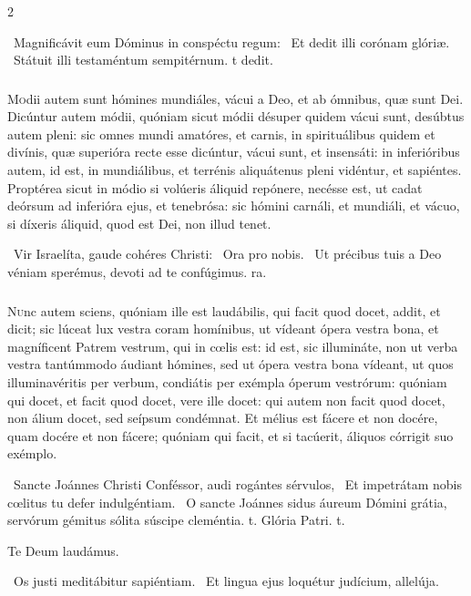 \documentclass[9pt,twoside]{extarticle}
\begin{document}
\begin{multicols}{2}
\begin{tightlist}{}
\item {}~Magnificávit eum Dóminus in conspéctu regum: \textred{*}~Et dedit illi corónam glóriæ. ~Státuit illi testaméntum sempitérnum. t dedit.
\end{tightlist}

\subsubsection*{\center{}}
\lettrine{M}odii autem sunt hómines mundiáles, vácui a Deo, et ab ómnibus, quæ sunt Dei. Dicúntur autem módii, quóniam sicut módii désuper quidem vácui sunt, desúbtus autem pleni: sic omnes mundi amatóres, et carnis, in spirituálibus quidem et divínis, quæ superióra recte esse dicúntur, vácui sunt, et insensáti: in inferióribus autem, id est, in mundiálibus, et terrénis aliquátenus pleni vidéntur, et sapiéntes. Proptérea sicut in módio si volúeris áliquid repónere, necésse est, ut cadat deórsum ad inferióra ejus, et tenebrósa: sic hómini carnáli, et mundiáli, et vácuo, si díxeris áliquid, quod est Dei, non illud tenet.

\begin{tightlist}{}
\item {}~Vir Israelíta, gaude cohéres Christi: \textred{*}~Ora pro nobis. ~Ut précibus tuis a Deo véniam sperémus, devoti ad te confúgimus. ra.
\end{tightlist}

\subsubsection*{\center{}}
\lettrine{N}unc autem sciens, quóniam ille est laudábilis, qui facit quod docet, addit, et dicit; sic lúceat lux vestra coram homínibus, ut vídeant ópera vestra bona, et magníficent Patrem vestrum, qui in cœlis est: id est, sic illumináte, non ut verba vestra tantúmmodo áudiant hómines, sed ut ópera vestra bona vídeant, ut quos illuminavéritis per verbum, condiátis per exémpla óperum vestrórum: quóniam qui docet, et facit quod docet, vere ille docet: qui autem non facit quod docet, non álium docet, sed seípsum condémnat. Et mélius est fácere et non docére, quam docére et non fácere; quóniam qui facit, et si tacúerit, áliquos córrigit suo exémplo.

\begin{tightlist}{}
\item {}~Sancte Joánnes Christi Conféssor, audi rogántes sérvulos, \textred{*}~Et impetrátam nobis cœlitus tu defer indulgéntiam. ~O sancte Joánnes sidus áureum Dómini grátia, servórum gémitus sólita súscipe cleméntia. t. Glória Patri. t.
\item Te Deum laudámus. 
\item {}~Os justi meditábitur sapiéntiam. ~Et lingua ejus loquétur judícium, allelúja.
\end{tightlist}


\end{multicols}
\end{document}
